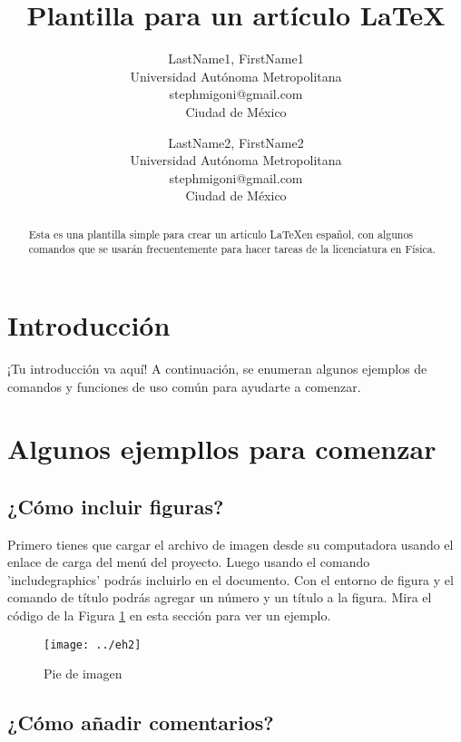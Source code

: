 \documentclass[12pt]{article}
\title{Plantilla para un artículo \LaTeX}
\author{
  LastName1, FirstName1\\
  \small Universidad Autónoma Metropolitana\\
  \small stephmigoni@gmail.com\\
  \small Ciudad de México
  \date{}
  \and
  LastName2, FirstName2\\
  \small Universidad Autónoma Metropolitana\\
  \small stephmigoni@gmail.com\\
  \small Ciudad de México
  \date{}
}
\begin{document}


\maketitle




\begin{abstract}
Esta es una plantilla simple para crear un articulo \LaTeX en español, con algunos comandos que se usarán frecuentemente para hacer tareas de la licenciatura en Física.
\end{abstract}

\section{Introducci\'on}

¡Tu introducción va aquí! A continuación, se enumeran algunos ejemplos de comandos y funciones de uso común para ayudarte a comenzar.

\section{Algunos ejempllos para comenzar}

\subsection{¿Cómo incluir figuras?}

Primero tienes que cargar el archivo de imagen desde su computadora usando el enlace de carga del menú del proyecto. Luego usando el comando 'includegraphics' podrás incluirlo en el documento. Con el entorno de figura y el comando de título podrás agregar un número y un título a la figura. Mira el código de la Figura \ref{fig:tesla} en esta sección para ver un ejemplo.


\begin{figure} %
    \centering
    \texttt{[image: ../eh2]}
    \caption{\label{fig:tesla}Pie de imagen}
\end{figure}


\subsection{¿Cómo añadir comentarios?}
% 
% 
% 
\end{document}
